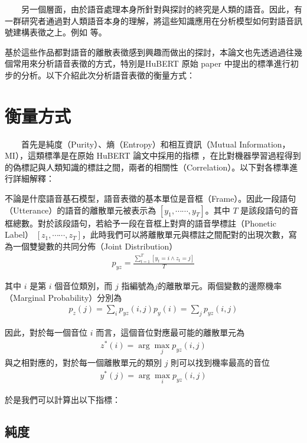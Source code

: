 　　另一個層面，由於語音處理本身所針對與探討的終究是人類的語音。因此，有一群研究者通過對人類語音本身的理解，將這些知識應用在分析模型如何對語音訊號建構表徵之上。例如  等。

        基於這些作品都對語音的離散表徵感到興趣而做出的探討，本論文也先透過過往幾個常用來分析語音表徵的方式，特別是HuBERT 原始 paper 中提出的標準進行初步的分析。以下介紹此次分析語音表徵的衡量方式：

\section{衡量方式}

　　首先是純度（Purity）、熵（Entropy）和相互資訊（Mutual Information，MI），這類標準是在原始 HuBERT 論文中採用的指標 \cite{hsu_hubert_2021, hsu_hubert_2021-2}，在比對機器學習過程得到的偽標記與人類知識的標註之間，兩者的相關性（Correlation）。以下對各標準進行詳細解釋：

        不論是什麼語音基石模型，語音表徵的基本單位是音框（Frame）。因此一段語句（Utterance）的語音的離散單元被表示為 $[y_1, \cdots\cdots, y_T]$。其中 $T$ 是該段語句的音框總數。對於該段語句，若給予一段在音框上對齊的語音學標註（Phonetic Label） $[z_1, \cdots\cdots, z_T]$，此時我們可以將離散單元與標註之間配對的出現次數，寫為一個雙變數的共同分佈（Joint Distribution）
    \begin{align}
      p_{yz} = \frac{\sum^T_{t=1}[{y_t = i \wedge z_t = j}]}{T}
    \end{align}

其中 $i$ 是第 $i$ 個音位類別，而 $j$ 指編號為$j$的離散單元。兩個變數的邊際機率（Marginal Probability）分別為
    \begin{align}
        p_z(j)=\sum_i{p_{yz}(i, j)}
    p_y(i)=\sum_j{p_{yz}(i, j)}
\end{align}

因此，對於每一個音位 $i$ 而言，這個音位對應最可能的離散單元為
    \begin{align}
      z^\ast(i) = \arg\max_j p_{yz}(i, j)
    \end{align}
與之相對應的，對於每一個離散單元的類別 $j$ 則可以找到機率最高的音位
    \begin{align}
      y^\ast(j) = \arg\max_i p_{yz}(i,j)
    \end{align}

於是我們可以計算出以下指標：

\subsection{純度}

